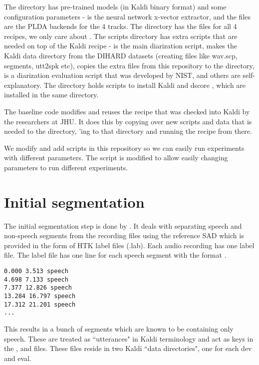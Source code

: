 The  directory has pre-trained models (in Kaldi binary format) and some configuration parameters -  is the neural network x-vector extractor, and the  files are the PLDA backends for the 4 tracks. The  directory has the  files for all 4 recipes, we only care about . The scripts directory has extra scripts that are needed on top of the  Kaldi recipe -  is the main diarization script,  makes the Kaldi data directory from the DIHARD datasets (creating files like wav.scp, segments, utt2spk etc),  copies the extra files from this repository to the  directory,  \cite{mdeval2006} is a diarization evaluation script that was developed by NIST, and others are self-explanatory. The  directory holds scripts to install Kaldi and dscore \cite{dscore}, which are installed in the same directory.

The baseline code modifies and reuses the  recipe that was checked into Kaldi by the researchers at JHU. It does this by copying over new scripts and data that is needed to the  directory, 'ing to that directory and running the recipe from there.

We modify and add scripts in this repository so we can easily run experiments with different parameters. The  script is modified to allow easily changing parameters to run different experiments.

\section{Initial segmentation}
The initial segmentation step is done by . It deals with separating speech and non-speech segments from the recording files using the reference SAD which is provided in the form of HTK label files (.lab). Each audio recording has one label file. The label file has one line for each speech segment with the format .

\begin{verbatim}
0.000 3.513 speech
4.698 7.133 speech
7.377 12.826 speech
13.284 16.797 speech
17.312 21.201 speech
...
\end{verbatim}

This results in a bunch of segments which are known to be containing only speech. These are treated as ``utterances" in Kaldi terminology and act as keys in the ,  and  files. These files reside in two Kaldi ``data directories", one for each dev and eval.

